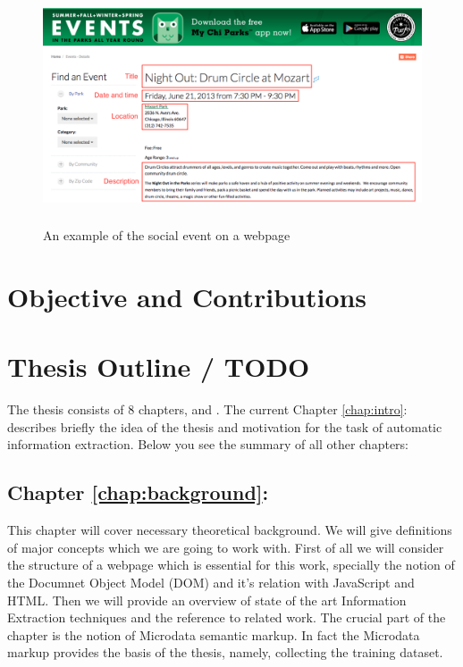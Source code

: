 \begin{figure}[h]
\begin{center}
\includegraphics[height=7cm]{figures01/event_example}
\caption{An example of the social event on a webpage}
\label{fig:webevent}
\end{center}
\end{figure}



\section{Objective and Contributions}

\section{Thesis Outline / TODO}
The thesis consists of 8 chapters,  and . 
The current Chapter \ref{chap:intro}:  describes briefly the idea of the thesis and motivation for the task of automatic information extraction. Below you see the summary of all other chapters:
 
\subsection* {Chapter \ref{chap:background}: }
This chapter will cover necessary theoretical background. We will give definitions of major concepts which we are going to work with. First of all we will consider the structure of a webpage which is essential for this work, specially the notion of the Documnet Object Model (DOM) and it's relation with JavaScript and HTML. Then we will provide an overview of state of the art Information Extraction techniques and the reference to related work. The crucial part of the chapter is the notion of Microdata semantic markup. In fact the Microdata markup provides the basis of the thesis, namely, collecting the training dataset.  

